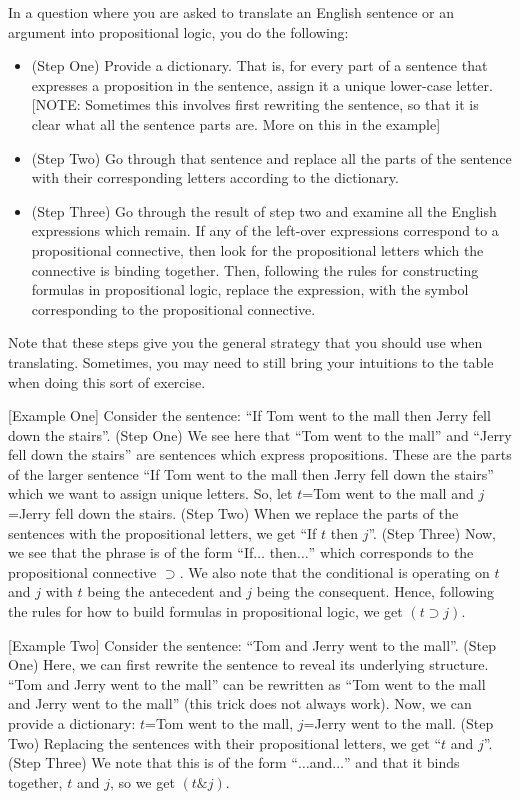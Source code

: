 \documentclass[
]{book}
\providecommand{\tightlist}{%
  \setlength{\itemsep}{0pt}\setlength{\parskip}{0pt}}
\begin{document}
In a question where you are asked to translate an English sentence or an argument into propositional logic, you do the following:

\begin{itemize}
\tightlist
\item
  (Step One) Provide a dictionary. That is, for every part of a sentence that expresses a proposition in the sentence, assign it a unique lower-case letter. {[}NOTE: Sometimes this involves first rewriting the sentence, so that it is clear what all the sentence parts are. More on this in the example{]}
\item
  (Step Two) Go through that sentence and replace all the parts of the sentence with their corresponding letters according to the dictionary.
\item
  (Step Three) Go through the result of step two and examine all the English expressions which remain. If any of the left-over expressions correspond to a propositional connective, then look for the propositional letters which the connective is binding together. Then, following the rules for constructing formulas in propositional logic, replace the expression, with the symbol corresponding to the propositional connective.
\end{itemize}

Note that these steps give you the general strategy that you should use when translating. Sometimes, you may need to still bring your intuitions to the table when doing this sort of exercise.

{[}Example One{]} Consider the sentence: ``If Tom went to the mall then Jerry fell down the stairs''. (Step One) We see here that ``Tom went to the mall'' and ``Jerry fell down the stairs'' are sentences which express propositions. These are the parts of the larger sentence ``If Tom went to the mall then Jerry fell down the stairs'' which we want to assign unique letters. So, let \(t\)=Tom went to the mall and \(j\)=Jerry fell down the stairs. (Step Two) When we replace the parts of the sentences with the propositional letters, we get ``If \(t\) then \(j\)''. (Step Three) Now, we see that the phrase is of the form ``If\(\ldots\) then\(\ldots\)'' which corresponds to the propositional connective \(\supset\). We also note that the conditional is operating on \(t\) and \(j\) with \(t\) being the antecedent and \(j\) being the consequent. Hence, following the rules for how to build formulas in propositional logic, we get \((t \supset j)\).

{[}Example Two{]} Consider the sentence: ``Tom and Jerry went to the mall''. (Step One) Here, we can first rewrite the sentence to reveal its underlying structure. ``Tom and Jerry went to the mall'' can be rewritten as ``Tom went to the mall and Jerry went to the mall'' (this trick does not always work). Now, we can provide a dictionary: \(t\)=Tom went to the mall, \(j\)=Jerry went to the mall. (Step Two) Replacing the sentences with their propositional letters, we get ``\(t\) and \(j\)''. (Step Three) We note that this is of the form ``\(\ldots\)and\(\ldots\)'' and that it binds together, \(t\) and \(j\), so we get \((t \& j)\).
\end{document}
